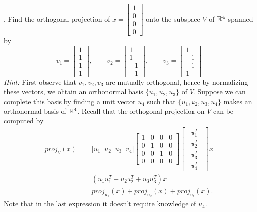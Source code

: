 \documentclass[12pt,a4paper]{article}
\renewcommand{\l}{\left}
\renewcommand{\r}{\right}
\def\R{\ifmmode\mathbb R\fi}
\begin{document}
. Find the orthogonal projection of $
x = \l[
\begin{array}{c}
	1\\ 0\\ 0\\ 0
\end{array}\r]
$ onto the subspace $V$ of $\R^4$ spanned by 
$$
v_1 = \l[
\begin{array}{c}
	1\\ 1\\ 1\\ 1
\end{array}\r]
, \qquad
v_2 = \l[
\begin{array}{c}
	1\\ 1\\ -1\\ -1
\end{array}\r]
, \qquad
v_3 = \l[
\begin{array}{c}
	1\\ -1\\ -1\\ 1
\end{array}\r]
$$
\textit{Hint:} First observe that $v_1, v_2, v_3$ are mutually orthogonal, hence by normalizing these vectors, we obtain an orthonormal basis $\{u_1, u_2, u_3\}$ of $V$. Suppose we can complete this basis by finding a unit vector $u_4$ such that $\{u_1, u_2, u_3, u_4\}$ makes an orthonormal basis of $\R^4$. Recall that the orthogonal projection on $V$ can be computed by 
\begin{align*}
	proj_V(x) & = \Big[u_1 \;\; u_2 \;\; u_3 \;\; u_4\Big]\l[
\begin{array}{cccc}
	1&0&0&0\\
	0&1&0&0\\
	0&0&1&0\\
	0&0&0&0
\end{array}
\r]\l[
\begin{array}{c}
	\;\;u_1^T\;\;\\
	\;\;u_2^T\;\;\\
	\;\;u_3^T\;\;\\
	\;\;u_4^T\;\;
\end{array}
\r]x \\
&= \l(u_1u_1^T + u_2u_2^T + u_3u_3^T\r)x \\
&= proj_{u_1}(x) + proj_{u_2}(x) + proj_{u_3}(x).
\end{align*}
Note that in the last expression it doesn't require knowledge of $u_4$. \\
\\
\end{document}
